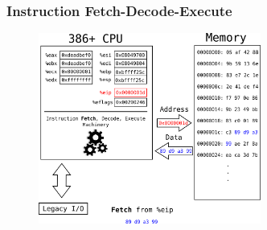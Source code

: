\documentclass[11pt,xcolor=dvipsnames]{beamer}
\newcommand{\mvs}{\vspace{-0.95em}}
\begin{document}
\begin{frame}[fragile,t]
\frametitle{Instruction Fetch-Decode-Execute}
\mvs
\begin{figure}
\centering \includegraphics[width=0.65\textwidth]{figures/386fetch_decode_execute7.png}
\end{figure}
\end{frame}
\end{document}
